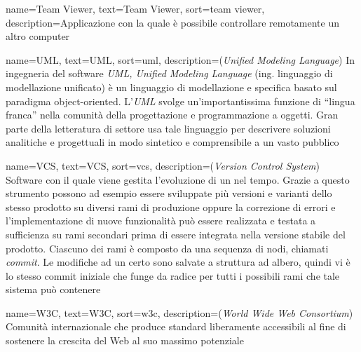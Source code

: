 {
    name={Team Viewer},
    text=Team Viewer,
    sort=team viewer,
    description={Applicazione con la quale è possibile controllare remotamente un altro computer}
}

{
    name={UML},
    text=UML,
    sort=uml,
    description={(\emph{Unified Modeling Language}) In ingegneria del software \emph{UML, Unified Modeling Language} (ing. linguaggio di modellazione unificato) è un linguaggio di modellazione e specifica basato sul paradigma object-oriented. L'\emph{UML} svolge un'importantissima funzione di ``lingua franca'' nella comunità della progettazione e programmazione a oggetti. Gran parte della letteratura di settore usa tale linguaggio per descrivere soluzioni analitiche e progettuali in modo sintetico e comprensibile a un vasto pubblico}
}

{
    name={VCS},
    text=VCS,
    sort=vcs,
    description={(\emph{Version Control System}) Software con il quale viene gestita l'evoluzione di un  nel tempo. Grazie a questo strumento possono ad esempio essere sviluppate più versioni e varianti dello stesso prodotto su diversi rami di produzione oppure la correzione di errori e l'implementazione di nuove funzionalità può essere realizzata e testata a sufficienza su rami secondari prima di essere integrata nella versione stabile del prodotto.
    Ciascuno dei rami è composto da una sequenza di nodi, chiamati \emph{commit}. Le modifiche ad un certo  sono salvate a struttura ad albero, quindi vi è lo stesso commit iniziale che funge da radice per tutti i possibili rami che tale sistema può contenere}
}

{
    name={W3C},
    text=W3C,
    sort=w3c,
    description={(\emph{World Wide Web Consortium}) Comunità internazionale che produce standard liberamente accessibili al fine di sostenere la crescita del Web al suo massimo potenziale}
}
